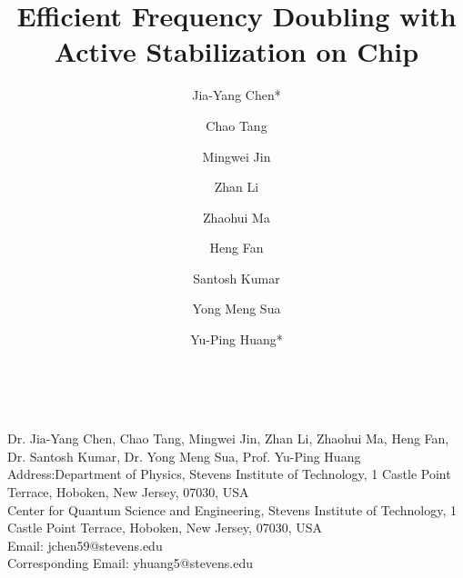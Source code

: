 \documentclass{WileyMSP-template}
\begin{document}
\pagestyle{fancy}



\title{Efficient Frequency Doubling with Active Stabilization on Chip} 

\maketitle


\author{Jia-Yang Chen*}
\author{Chao Tang}
\author{Mingwei Jin}
\author{Zhan Li}
\author{Zhaohui Ma}
\author{Heng Fan}
\author{Santosh Kumar}\\
\author{Yong Meng Sua}
\author{Yu-Ping Huang*}



\begin{affiliations}
Dr. Jia-Yang Chen, Chao Tang, Mingwei Jin, Zhan Li, Zhaohui Ma, Heng Fan, Dr. Santosh Kumar, Dr. Yong Meng Sua, Prof. Yu-Ping Huang\\
Address:Department of Physics, Stevens Institute of Technology, 1 Castle Point Terrace, Hoboken, New Jersey, 07030, USA\\
Center for Quantum Science and Engineering, Stevens Institute of Technology, 1 Castle Point Terrace, Hoboken, New Jersey, 07030, USA\\
Email: jchen59@stevens.edu\\
Corresponding Email: yhuang5@stevens.edu

\end{affiliations}

\end{document}
